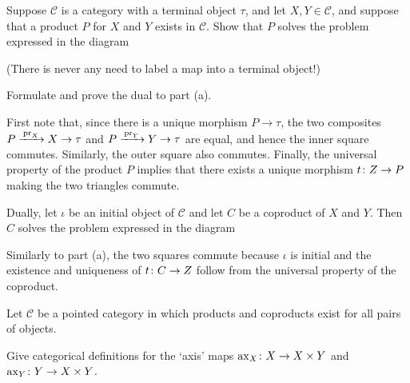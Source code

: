 \bp
\ben[label=(\alph*)]
\item Suppose $\mathcal{C}$ is a category with a terminal object $\tau$, and let $X,Y\in\mathcal{C}$, and suppose that a product $P$ for $X$ and $Y$ exists in $\mathcal{C}$. Show that $P$ solves the problem expressed in the diagram
\bse
{}
\ese
(There is never any need to label a map into a terminal object!)
\item Formulate and prove the dual to part (a).
\een
\ep

\bs
\ben[label=(\alph*)]
\item First note that, since there is a unique morphism $P\to \tau$, the two composites $P\xrightarrow{\, \mathrm{pr}_X\, } X \to \tau$ and $P\xrightarrow{\, \mathrm{pr}_Y\, } Y \to \tau$ are equal, and hence the inner square commutes. Similarly, the outer square also commutes.
Finally, the universal property of the product $P$ implies that there exists a unique morphism $t\colon Z \to P$ making the two triangles commute.
\item Dually, let $\iota$ be an initial object of $\mathcal{C}$ and let $C$ be a coproduct of $X$ and $Y$. Then $C$ solves the problem expressed in the diagram
\bse
{}
\ese
Similarly to part (a), the two squares commute because $\iota$ is initial and the existence and uniqueness of $t\colon C\to Z$ follow from the universal property of the coproduct.
\een
\es


\bp
Let $\mathcal{C}$ be a pointed category in which products and coproducts exist for all pairs of objects.
\ben[label=(\alph*)]
\item Give categorical definitions for the `axis' maps $\mathrm{ax}_X\colon X\to X\times Y$ and $\mathrm{ax}_Y\colon Y\to X\times Y$.

